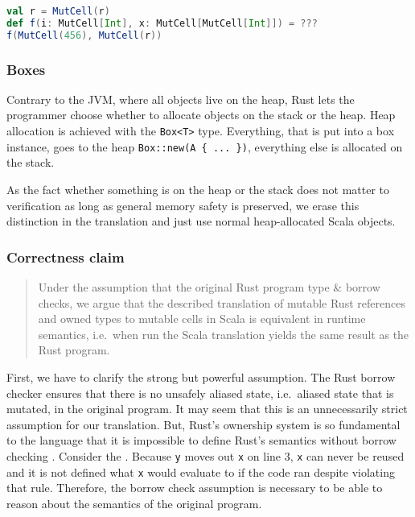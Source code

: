 \begin{lstlisting}[language=Scala]
val r = MutCell(r)
def f(i: MutCell[Int], x: MutCell[MutCell[Int]]) = ???
f(MutCell(456), MutCell(r))
\end{lstlisting}

\subsubsection{Boxes}

Contrary to the JVM, where all objects live on the heap, Rust lets the
programmer choose whether to allocate objects on the stack or the heap.
Heap allocation is achieved with the \passthrough{\lstinline!Box<T>!}
type. Everything, that is put into a box instance, goes to the heap
\passthrough{\lstinline!Box::new(A \{ ... \})!}, everything else is
allocated on the stack.

As the fact whether something is on the heap or the stack does not
matter to verification as long as general memory safety is preserved, we
erase this distinction in the translation and just use normal
heap-allocated Scala objects.

\subsubsection{Correctness claim}

\begin{quote}
Under the assumption that the original Rust program type \& borrow
checks, we argue that the described translation of mutable Rust
references and owned types to mutable cells in Scala is equivalent in
runtime semantics, i.e.~when run the Scala translation yields the same
result as the Rust program.
\end{quote}

First, we have to clarify the strong but powerful assumption. The Rust
borrow checker ensures that there is no unsafely aliased state,
i.e.~aliased state that is mutated, in the original program. It may seem
that this is an unnecessarily strict assumption for our translation.
But, Rust's ownership system is so fundamental to the language that it
is impossible to define Rust's semantics without borrow checking
. Consider the . Because
\passthrough{\lstinline!y!} moves out \passthrough{\lstinline!x!} on
line 3, \passthrough{\lstinline!x!} can never be reused and it is not
defined what \passthrough{\lstinline!x!} would evaluate to if the code
ran despite violating that rule. Therefore, the borrow check assumption
is necessary to be able to reason about the semantics of the original
program.

